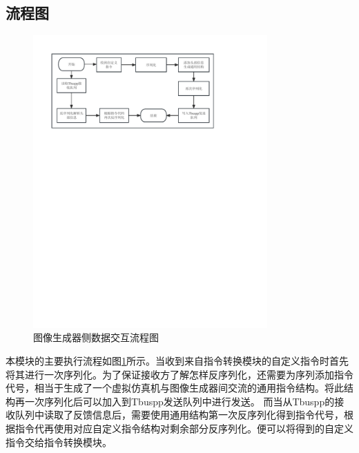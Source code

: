 \subsection{流程图}
\begin{figure}[h!]
    \begin{center}
        \includegraphics[width=0.8\textwidth]{pictures/flowchart3.pdf}
        \caption{图像生成器侧数据交互流程图}
        \label{module31}
    \end{center}
\end{figure}
 本模块的主要执行流程如图\ref{module31}所示。当收到来自指令转换模块的自定义指令时首先将其进行一次序列化。为了保证接收方了解怎样反序列化，还需要为序列添加指令代号，相当于生成了一个虚拟仿真机与图像生成器间交流的通用指令结构。将此结构再一次序列化后可以加入到Tbuspp发送队列中进行发送。
 而当从Tbuspp的接收队列中读取了反馈信息后，需要使用通用结构第一次反序列化得到指令代号，根据指令代再使用对应自定义指令结构对剩余部分反序列化。便可以将得到的自定义指令交给指令转换模块。

